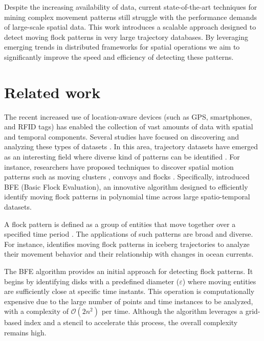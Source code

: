 Despite the increasing availability of data, current state-of-the-art techniques for mining complex movement patterns still struggle with the performance demands of large-scale spatial data. This work introduces a scalable approach designed to detect moving flock patterns in very large trajectory databases. By leveraging emerging trends in distributed frameworks for spatial operations we aim to significantly improve the speed and efficiency of detecting these patterns.

\section{Related work}
The recent increased use of location-aware devices (such as GPS, smartphones, and RFID tags) has enabled the collection of vast amounts of data with spatial and 
temporal components.  Several studies have focused on discovering and analyzing these types of datasets \cite{leung_knowledge_2010, miller_geographic_2001}.  In 
this area, trajectory datasets have emerged as an interesting field where diverse kind of patterns can be identified \cite{zheng_computing_2011, 
vieira_spatio-temporal_2013}.  For instance, researchers have proposed techniques to discover spatial motion patterns such as moving clusters 
\cite{kalnis_discovering_2005}, convoys \cite{jeung_discovery_2008} and flocks \cite{benkert_reporting_2008, gudmundsson_computing_2006}.  Specifically, 
\cite{vieira_-line_2009} introduced BFE (Basic Flock Evaluation), an innovative algorithm designed to efficiently identify moving flock patterns in polynomial 
time across large spatio-temporal datasets.

A flock pattern is defined as a group of entities that move together over a specified time period \cite{benkert_reporting_2008}. The applications of such 
patterns are broad and diverse. For instance, \cite{calderon_mining_2011} identifies moving flock patterns in iceberg trajectories to analyze their movement 
behavior and their relationship with changes in ocean currents.

The BFE algorithm provides an initial approach for detecting flock patterns. It begins by identifying disks with a predefined diameter ($\varepsilon$) where moving entities are sufficiently close at specific time instants. This operation is computationally expensive due to the large number of points and time instances to be analyzed, with a complexity of $\mathcal{O}(2n^2)$ per time. Although the algorithm leverages a grid-based index and a stencil to accelerate this process, the overall complexity remains high.

